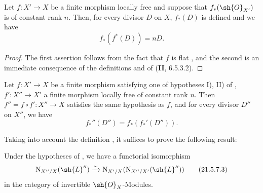 \begin{proposition}[21.5.6]
\label{IV.21.5.6}
Let $f:X'\to X$ be a finite morphism locally free and suppose that $f_*(\sh{O}_{X'})$ is of constant rank $n$.
Then, for every divisor $D$ on $X$, $f_*(D)$ is defined and we have
\[
\label{IV.21.5.6.1}
  f_*(f^*(D))=nD.
  \tag{21.5.6.1}
\]
\end{proposition}

\begin{proof}
The first assertion follows from the fact that $f$ is flat , and the second is an immediate consequence of the definitions and of (\textbf{II}, 6.5.3.2).
\end{proof}

\begin{proposition}[21.5.7]
\label{IV.21.5.7}
Let $f:X'\to X$ be a finite morphism satisfying one of hypotheses I), II) of , $f':X''\to X'$ a finite morphism locally free of constant rank $n$.
Then $f''=f\circ f':X''\to X$ satisfies the same hypothesis as $f$, and for every divisor $D''$ on $X''$, we have
\[
\label{IV.21.5.7.1}
  f_*''(D'')=f_*(f_*'(D'')).
  \tag{21.5.7.1}
\]
\end{proposition}

Taking into account the definition , it suffices to prove the following result:

\begin{lemma}[21.5.7.2]
\label{IV.21.5.7.2}
Under the hypotheses of , we have a functorial isomorphism
\[
\label{IV.21.5.7.3}
  \mathrm{N}_{X''/X}(\sh{L}'')\xrightarrow{\sim}\mathrm{N}_{X'/X}(\mathrm{N}_{X''/X'}(\sh{L}''))
  \tag{21.5.7.3}
\]
in the category of invertible $\sh{O}_X$-Modules.
\end{lemma}

